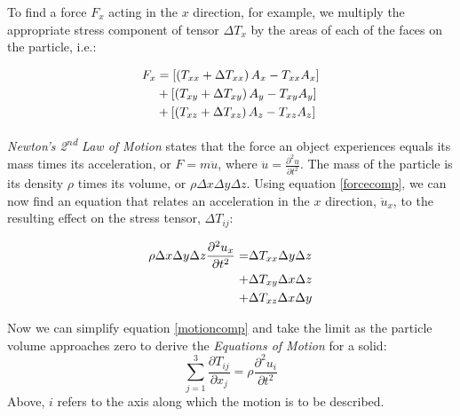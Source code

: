 \documentclass[a4paper,10pt]{report}
\numberwithin{equation}{section}
\begin{document}
To find a force $F_x$ acting in the $x$ direction, for example, we multiply the appropriate stress component of tensor $\Delta T_x$ by the areas of each of the faces on the particle, i.e.\cite[p.~15]{Ballantine1997}:
\begin{singlespace}
\begin{align}\label{forcecomp}
F_x &= \left[ \left( T_{xx} + \Delta T_{xx} \right) A_x - T_{xx} A_x \right]
\notag \\
&+ \left[ \left( T_{xy} + \Delta T_{xy} \right) A_y - T_{xy} A_y \right]  \\
&+ \left[ \left( T_{xz} + \Delta T_{xz} \right) A_z - T_{xz} A_z \right] \notag
\end{align}
\end{singlespace}
\emph{Newton's 2\textsuperscript{nd} Law of Motion} states that the force an object experiences equals its
mass times its acceleration, or $F = m \ddot{u}$, where $\ddot{u}
= \frac{\partial^2u}{\partial t^2}$. The mass of the particle is its density
$\rho$ times its volume, or $\rho \Delta x \Delta y \Delta z$. 
Using equation \eqref{forcecomp}, we can now find an equation that relates an
acceleration in the $x$ direction, $\ddot{u}_x$, to the 
resulting effect on the stress tensor, $\Delta T_{ij}$\cite[p.~16]{Ballantine1997}:
\begin{singlespace}
\begin{align}\label{motioncomp}
\rho \Delta x \Delta y \Delta z \frac{\partial^2u_x}{\partial t^2} = &\Delta
T_{xx} \Delta y \Delta z \notag \\
+ &\Delta T_{xy} \Delta x \Delta z  \\
+ &\Delta T_{xz} \Delta x \Delta y \notag
\end{align}
\end{singlespace}
Now we can simplify equation \eqref{motioncomp} and take the limit as the
particle volume approaches zero to derive the \emph{Equations of Motion} for a
solid:
\begin{equation}\label{motion}
 \sum_{j=1}^{3} \frac{\partial T_{ij}}{\partial x_j} = \rho \frac{\partial ^2
u_i}{\partial t^2}
\end{equation}
Above, $i$ refers to the axis along which the motion is to be described.\cite[p.~16]{Ballantine1997} \cite[p.~4]{Kino1987}
\end{document}

